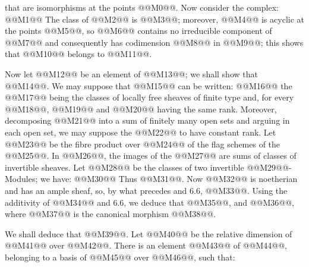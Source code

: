 that are isomorphisms at the points @@M0@@. Now consider the complex:
@@M1@@
The class of @@M2@@ is @@M3@@; moreover, @@M4@@ is acyclic at the points @@M5@@, so @@M6@@ contains no irreducible component of @@M7@@ and consequently has codimension @@M8@@ in @@M9@@; this shows that @@M10@@ belongs to @@M11@@.

Now let @@M12@@ be an element of @@M13@@; we shall show that @@M14@@. We may suppose that @@M15@@ can be written:
@@M16@@
the @@M17@@ being the classes of locally free sheaves of finite type and, for every @@M18@@, @@M19@@ and @@M20@@ having the same rank. Moreover, decomposing @@M21@@ into a sum of finitely many open sets and arguing in each open set, we may suppose the @@M22@@ to have constant rank. Let @@M23@@ be the fibre product over @@M24@@ of the flag schemes of the @@M25@@. In @@M26@@, the images of the @@M27@@ are sums of classes of invertible sheaves. Let @@M28@@ be the classes of two invertible @@M29@@-Modules; we have:
@@M30@@
Thus @@M31@@. Now @@M32@@ is noetherian and has an ample sheaf, so, by what precedes and 6.6, @@M33@@. Using the additivity of @@M34@@ and 6.6, we deduce that @@M35@@, and @@M36@@, where @@M37@@ is the canonical morphism @@M38@@.

We shall deduce that @@M39@@. Let @@M40@@ be the relative dimension of @@M41@@ over @@M42@@. There is an element @@M43@@ of @@M44@@, belonging to a basis of @@M45@@ over @@M46@@, such that:
